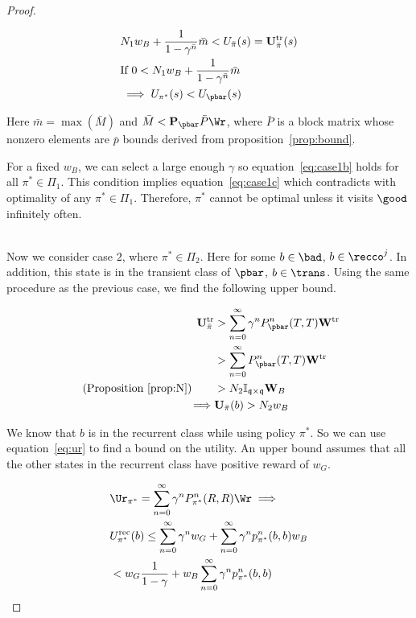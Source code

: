 \begin{proof}
\begin{itemize}
\begin{align}
\label{eq:case1}
& N_1w_B +  \frac{1}{1-\gamma^{\bar{n}}} \bar{m} < U_{\bar{\pi}} (s) = {\bf U}_{\bar{\pi}}^{\text{tr}} (s) \\
\label{eq:case1b}
&\text{If } 0<N_1w_B + \frac{1}{1-\gamma^{\bar{n}}} \bar{m} \\
\label{eq:case1c}
&\implies
U_{\pi^*}(s) < U_{\pbar}(s)
\end{align}
 
 Here $\bar{m} = \max (\bar{M})$ and $\bar{M} < {\bf P}_{\pbar}\bar{P}\Wr$, where $\bar{P}$ is a block matrix whose nonzero elements are $\bar{p}$ bounds derived from proposition~\ref{prop:bound}.
 
 



For a fixed $w_B$, we can select a large enough $\gamma$ so equation~\eqref{eq:case1b} holds for all $\pi^* \in \Pi_1$.
This condition implies equation~\eqref{eq:case1c} which contradicts with optimality of any $\pi^* \in \Pi_1$. Therefore, $\pi^*$ cannot be optimal unless it visits $\good$ infinitely often.
\end{itemize}

\\
Now we consider case $2$, where $\pi^* \in \Pi_2$.  Here for some $b \in \bad$, $b \in \recco^j $. In addition, this state is in the transient class of $\pbar$, $b \in \trans$.
Using the same procedure as the previous case, we find the following upper bound.


\begin{align}
{\bf U}_{\bar{\pi}}^{\text{tr}} &>\sum_{n = 0}^\infty \gamma^n P_{\pbar}^n(T,T){\bf W}^{\text{tr}}  \\
&>\sum_{n=0}^\infty  P_{\pbar}^n (T,T){\bf W}^{\text{tr}} \\
 \text{ (Proposition~\ref{prop:N})}\quad \quad &> N_2{\mathbb I}_{\mathfrak{q}\times \mathfrak{q}} {\bf W}_B\\
\implies & 
{\bf U}_{\bar{\pi}} (b)  > N_2w_B 
\end{align}




We know that $b$ is in the recurrent class while using policy $\pi^*$. So we can use equation~\eqref{eq:ur} to find a bound on the utility. An upper bound assumes that all the other states in the recurrent class have positive reward of $w_G$.

\begin{align}
\label{eq:ur1}
&\Ur_{\pi^*} 
 = \sum_{n=0}^\infty \gamma^n P_{\pi^*}^n(R,R) \Wr \implies \\
 &U^{\text{rec}}_{\pi^*}(b) \leq \sum_{n=0}^\infty \gamma^n w_G  + \sum_{n=0}^\infty \gamma^n p_{\pi^*}^n(b,b) w_B \\
 &< w_G \frac{1}{1-\gamma}  + w_B\sum_{n=0}^\infty \gamma^n p_{\pi^*}^n(b,b)
\end{align}


\end{proof}
